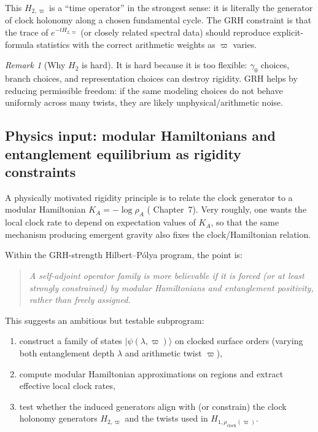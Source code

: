 \documentclass[11pt,oneside]{amsbook}
\numberwithin{equation}{section}
\theoremstyle{plain}
\theoremstyle{definition}
\theoremstyle{remark}
\newtheorem{remark}[theorem]{Remark}
\begin{document}
This $H_{2,\varpi}$ is a ``time operator'' in the strongest sense: it is literally the generator of clock holonomy along a chosen fundamental cycle.
The GRH constraint is that the trace of $e^{-tH_{2,\varpi}}$ (or closely related spectral data) should reproduce explicit-formula statistics with the correct arithmetic weights as $\varpi$ varies.

\begin{remark}[Why $H_2$ is hard]
It is hard because it is too flexible: $\gamma_0$ choices, branch choices, and representation choices can destroy rigidity.
GRH helps by reducing permissible freedom: if the same modeling choices do not behave uniformly across many twists, they are likely unphysical/arithmetic noise.
\end{remark}

\subsection{Physics input: modular Hamiltonians and entanglement equilibrium as rigidity constraints}
\label{sec:physics_input}

A physically motivated rigidity principle is to relate the clock generator to a modular Hamiltonian $K_A=-\log\rho_A$ ( Chapter~7).
Very roughly, one wants the local clock rate to depend on expectation values of $K_A$, so that the same mechanism producing emergent gravity also fixes the clock/Hamiltonian relation.

Within the GRH-strength Hilbert--Pólya program, the point is:
\begin{quote}
\emph{A self-adjoint operator family is more believable if it is forced (or at least strongly constrained) by modular Hamiltonians and entanglement positivity, rather than freely assigned.}
\end{quote}

This suggests an ambitious but testable subprogram:
\begin{enumerate}
\item construct a family of states $|\psi(\lambda,\varpi)\rangle$ on clocked surface orders (varying both entanglement depth $\lambda$ and arithmetic twist $\varpi$),
\item compute modular Hamiltonian approximations on regions and extract effective local clock rates,
\item test whether the induced generators align with (or constrain) the clock holonomy generators $H_{2,\varpi}$ and the twists used in $H_{1,\rho_{\mathrm{clock}}(\varpi)}$.
\end{enumerate}
\end{document}
